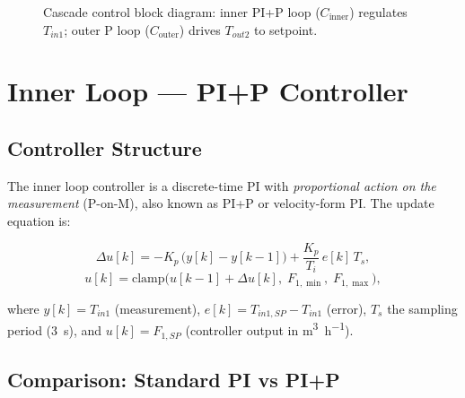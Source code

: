 \begin{figure}[H]
  \caption{Cascade control block diagram: inner PI+P loop ($C_{\text{inner}}$) regulates
    $T_{in1}$; outer P loop ($C_{\text{outer}}$) drives $T_{out2}$ to setpoint.}
  \label{fig:cascade_block}
\end{figure}

\section{Inner Loop --- PI+P Controller}

\subsection{Controller Structure}

The inner loop controller is a discrete-time PI with \textit{proportional action on the
measurement} (P-on-M), also known as PI+P or velocity-form PI. The update equation is:

\begin{equation}
  \Delta u[k] = -K_p\,\bigl(y[k] - y[k-1]\bigr)
                + \frac{K_p}{T_i}\,e[k]\,T_s,
  \label{eq:velocity_increment}
\end{equation}
\begin{equation}
  u[k] = \mathrm{clamp}\bigl(u[k-1] + \Delta u[k],\; F_{1,\min},\; F_{1,\max}\bigr),
  \label{eq:velocity_clamp}
\end{equation}

where $y[k] = T_{in1}$ (measurement), $e[k] = T_{in1,SP} - T_{in1}$ (error), $T_s$
the sampling period (\SI{3}{\second}), and $u[k] = F_{1,SP}$ (controller output in
\si{\metre\cubed\per\hour}).

\subsection{Comparison: Standard PI vs PI+P}

